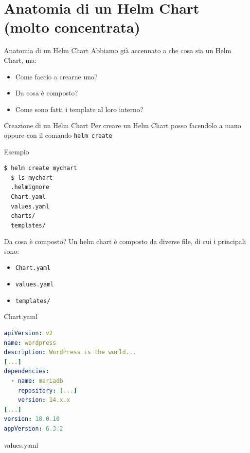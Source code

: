 \documentclass{beamer}
\begin{document}
\section{Anatomia di un Helm Chart (\textbf{molto} concentrata)}
 \begin{frame}{Anatomia di un Helm Chart}
  Abbiamo già accennato a che cosa sia un Helm Chart, ma: 
  \begin{itemize}
      \item Come faccio a crearne uno?
      \item Da cosa è composto?
      \item Come sono fatti i template al loro interno?
  \end{itemize}
  \framebreak
  \begin{block}{Creazione di un Helm Chart}
  Per creare un Helm Chart posso facendolo a mano oppure con il comando \lstinline[language=bash]{helm create} 
  \end{block}
  \framebreak
  \begin{block}{Esempio}
  \begin{lstlisting}[backgroundcolor=\color{white},language=bash,basicstyle=\small]
  $ helm create mychart
  $ ls mychart
  .helmignore
  Chart.yaml
  values.yaml
  charts/
  templates/
  \end{lstlisting}
  \end{block}
  \framebreak
  \begin{block}{Da cosa è composto?}
  Un helm chart è composto da diverse file, di cui i principali sono:
  \begin{itemize}
      \item \lstinline[language=bash]{Chart.yaml}
      \item \lstinline[language=bash]{values.yaml}
      \item \lstinline[language=bash]{templates/}
  \end{itemize}
  \end{block}
  \framebreak
  \begin{block}{Chart.yaml}
  \begin{lstlisting}[backgroundcolor=\color{white},language=yaml,basicstyle=\tiny]
apiVersion: v2
name: wordpress
description: WordPress is the world...
[...]
dependencies:
  - name: mariadb
    repository: [...]
    version: 14.x.x
[...]
version: 18.0.10
appVersion: 6.3.2
  \end{lstlisting}
  \end{block}
  \framebreak
  \begin{block}{values.yaml}
  \begin{lstlisting}[backgroundcolor=\color{white},language=yaml,basicstyle=\tiny]
  

\end{lstlisting}
\end{block}
\end{frame}
\end{document}
